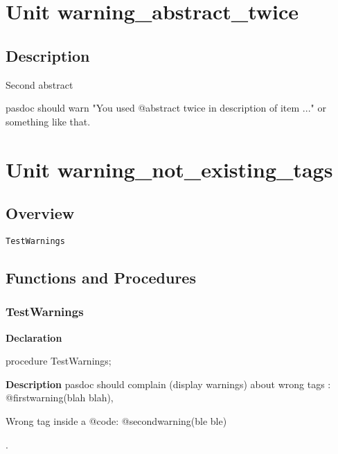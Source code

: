 \documentclass{report}
\newif\ifpdf
\begin{document}
\chapter{Unit warning{\_}abstract{\_}twice}
\label{warning_abstract_twice}
\section{Description}
Second abstract\hfill\vspace*{1ex}





pasdoc should warn "You used @abstract twice in description of item ..." or something like that.
\chapter{Unit warning{\_}not{\_}existing{\_}tags}
\label{warning_not_existing_tags}
\section{Overview}
\begin{description}
\item[\texttt{TestWarnings}]
\end{description}
\section{Functions and Procedures}
\ifpdf
\subsection*{\large{\textbf{TestWarnings}}\normalsize\hspace{1ex}\hrulefill}
\else
\subsection*{TestWarnings}
\fi
\label{warning_not_existing_tags-TestWarnings}
\begin{list}{}{
\setlength{\itemindent}{0cm}
\setlength{\listparindent}{0cm}
\setlength{\leftmargin}{\evensidemargin}
\addtolength{\leftmargin}{\tmplength}
\settowidth{\labelsep}{X}
\addtolength{\leftmargin}{\labelsep}
\setlength{\labelwidth}{\tmplength}
}
\item[\textbf{Declaration}\hfill]
\ifpdf
\begin{flushleft}
\fi
\begin{ttfamily}
procedure TestWarnings;\end{ttfamily}

\ifpdf
\end{flushleft}
\fi

\par
\item[\textbf{Description}]
pasdoc should complain (display warnings) about wrong tags : @firstwarning(blah blah), \begin{ttfamily}Wrong tag inside a @code: @secondwarning(ble ble)\end{ttfamily}.

\end{list}
\end{document}
